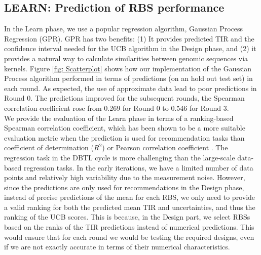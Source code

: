 \documentclass{scrartcl}[2013/05/29]%
\begin{document}
\subsection{LEARN: Prediction of RBS performance}
\label{sec:gp-results}
\label{subsec: results LEARN}

In the Learn phase, we use a popular regression algorithm, Gaussian Process Regression (GPR). GPR has two benefits: (1) It provides predicted TIR and the confidence interval needed for the UCB algorithm in the Design phase, and (2) it provides a natural way to calculate similarities between genomic sequences via kernels.
Figure \ref{fig: Scatterplot} shows how our implementation of the Gaussian Process algorithm performed in terms of predictions (on an hold out test set) in each round. 
As expected, the use of approximate data lead to poor predictions in Round 0.
The predictions improved for the subsequent rounds, the Spearman correlation coefficient rose from 0.269 for Round 0 to 0.546 for Round 3.
\\

We provide the evaluation of the Learn phase in terms of a ranking-based Spearman correlation coefficient, which has been shown to be a more suitable evaluation metric when the prediction is used for recommendation tasks than coefficient of determination ($R^2$) or Pearson correlation coefficient
\cite{Schober2018,  Kang2019}.
The regression task in the DBTL cycle is more challenging than the large-scale data-based regression tasks.
In the early iterations, we have a limited number of data points and relatively high variability due to the measurement noise.
However, since the predictions are only used for recommendations in the Design phase, instead of precise predictions of the mean for each RBS, we only need to provide a valid ranking for both the predicted mean TIR and uncertainties, and thus the ranking of the UCB scores.
This is because, in the Design part, we select RBSs based on the ranks of the TIR predictions instead of numerical predictions.
This would ensure that for each round we would be testing the required designs, even if we are not exactly accurate in terms of their numerical characteristics.
\\
\end{document}
